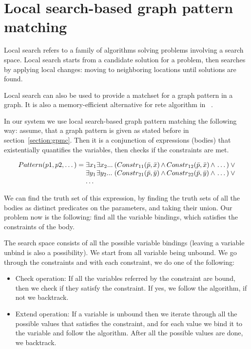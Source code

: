 \section{Local search-based graph pattern matching}


Local search refers to a family of algorithms solving problems involving a search space. 
Local search starts from a candidate solution for a problem, then searches by applying local changes: moving to neighboring locations until solutions are found.

Local search can also be used to provide a matchset for a graph pattern in a graph.
It is also a memory-efficient alternative for rete algorithm in \viatra{}~\cite{bur-marton-msc}.

In our system we use local search-based graph pattern matching the following way:
assume, that a graph pattern is given as stated before in section~\ref{section:gpmc}.
Then it is a conjunction of expressions (bodies) that existentially quantifies the variables, then checks if the constraints are met.


\begin{equation}
\begin{array}{@{}r@{}l@{}l@{}l@{}l@{}l@{}}
Pattern(p1, p2, \dots) = \;
& \exists{x_1} & \exists{x_2}... \: & 
(Constr_{11}(\bar{p},\bar{x} ) & \, \wedge \, Constr_{12}(\bar{p},\bar{x} ) & \, \wedge \, \dots{}) \: \vee \\

& \exists{y_1} & \exists{y_2}... \: & 
(Constr_{21}(\bar{p},\bar{y} ) & \, \wedge \, Constr_{22}(\bar{p},\bar{y} ) & \, \wedge \, \dots{}) \: \vee \\
& \dots{}
\end{array}
\end{equation}

We can find the truth set of this expression, by finding the truth sets of all the bodies as distinct predicates on the parameters, and taking their union.
Our problem now is the following: find all the variable bindings, which satisfies the constraints of the body.


The search space consists of all the possible variable bindings (leaving a variable unbind is also a possibility). 
We start from all variable being unbound. 
We go through the constraints and with each constraint, we do one of the following:
\begin{itemize}
	\item Check operation: If all the variables referred by the constraint are bound, then we check if they satisfy the constraint. If yes, we follow the algorithm, if not we backtrack.
	\item Extend operation: If a variable is unbound then we iterate through all the possible values that satisfies the constraint, and for each value we bind it to the variable and follow the algorithm. After all the possible values are done, we backtrack.
\end{itemize}

